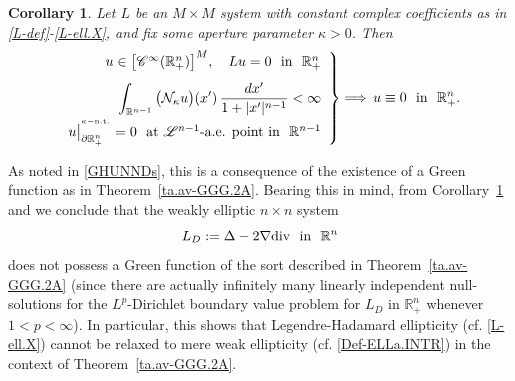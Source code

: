 \documentclass[11pt,reqno]{amsart}
\numberwithin{equation}{section}
\newtheorem{corollary}[theorem]{Corollary}
\theoremstyle{remark}
\begin{document}
\begin{corollary}\label{thm:FP.CCC}
Let $L$ be an $M\times M$ system with constant complex coefficients as in \eqref{L-def}-\eqref{L-ell.X}, 
and fix some aperture parameter $\kappa>0$. Then 
%
\begin{equation}\label{jk-lm-jhR-LLL-HM-RN.w.}
\left.
\begin{array}{r}
u\in\big[{\mathscr{C}}^{\infty}({\mathbb{R}}^n_{+})\big]^M,\quad Lu=0\,\,\text{ in }\,\,{\mathbb{R}}^n_{+}
\\[8pt]
\displaystyle
\int_{\mathbb{R}^{n-1}}\big({\mathcal{N}}_{\kappa}u\big)(x')\,\frac{dx'}{1+|x'|^{n-1}}<\infty
\\[8pt]
u\big|^{{}^{\kappa-{\rm n.t.}}}_{\partial{\mathbb{R}}^n_{+}}=0\,\,\text{ at ${\mathscr{L}}^{n-1}$-a.e. point in }\,\,{\mathbb{R}}^{n-1}
\end{array}
\right\}
\Longrightarrow\,u\equiv 0\,\,\text{ in }\,\,{\mathbb{R}}^n_{+}.
\end{equation}
\end{corollary}

As noted in \eqref{GHUNNDs}, this is a consequence of the existence of a Green function as in Theorem~\ref{ta.av-GGG.2A}. Bearing this in mind, 
from Corollary~\ref{thm:FP.CCC} and \cite[(2.6.13), p.\,104]{GHA.V} we conclude that the weakly elliptic $n\times n$ system 
%
\begin{equation}\label{eq:LD}
L_D:=\Delta-2\nabla{\rm div}\,\,\text{ in }\,\,{\mathbb{R}}^n
\end{equation}
%
does not possess a Green function of the sort described in Theorem~\ref{ta.av-GGG.2A} (since there are actually infinitely many linearly 
independent null-solutions for the $L^p$-Dirichlet boundary value problem for $L_D$ in ${\mathbb{R}}^n_{+}$ whenever $1<p<\infty$). 
In particular, this shows that Legendre-Hadamard ellipticity (cf. \eqref{L-ell.X}) cannot be relaxed to mere weak ellipticity 
(cf. \eqref{Def-ELLa.INTR}) in the context of Theorem~\ref{ta.av-GGG.2A}.
\end{document}
